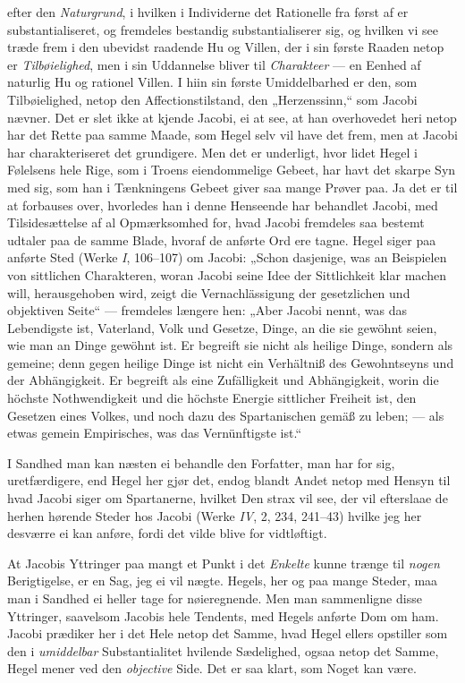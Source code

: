 \documentclass[12pt,a4paper]{book}
\newcommand{\apage}[1]{\marginnote{\footnotesize\textit{[#1]}}}
\begin{document}
efter den \emph{Naturgrund}, i hvilken i Individerne det Rationelle fra først af er
substantialiseret, og fremdeles bestandig substantialiserer sig, og hvilken vi
see træde frem i den ubevidst raadende Hu og Villen, der i sin første Raaden
netop er \emph{Tilbøielighed}, men i sin Uddannelse bliver til \emph{Charakteer} --- en
Eenhed af naturlig Hu og rationel Villen. I hiin sin første Umiddelbarhed er
den, som Tilbøielighed, netop den Affectionstilstand, den „Herzenssinn,“ som
Jacobi nævner. Det er slet ikke at kjende Jacobi, ei at see, at han overhovedet
heri netop har det Rette paa samme Maade, som Hegel selv vil have det frem, men
at Jacobi har charakteriseret det grundigere. Men det er underligt, hvor lidet
Hegel i Følelsens hele Rige, som i Troens eiendommelige Gebeet, har havt det
skarpe Syn med sig, som han i Tænkningens Gebeet giver saa mange Prøver paa. Ja
det er til at forbauses over, hvorledes han i denne Henseende har behandlet
Jacobi, med Tilsidesættelse af al Opmærksomhed for, hvad Jacobi fremdeles saa
bestemt udtaler paa de samme Blade, hvoraf de anførte Ord ere tagne. Hegel
siger paa anførte Sted (Werke \textit{I}, 106--107) om Jacobi: „Schon dasjenige, was an
Beispielen von sittlichen Charakteren, woran Jacobi seine Idee der Sittlichkeit
klar machen will, herausgehoben wird, zeigt die Vernachlässigung der
gesetzlichen und objektiven Seite“ --- fremdeles længere hen: „Aber Jacobi
nennt, was das Lebendigste ist, Vaterland, Volk und Gesetze, Dinge, an die sie
gewöhnt seien, wie man an Dinge gewöhnt ist. Er begreift sie nicht als heilige
Dinge, sondern als \apage{124} gemeine; denn gegen heilige Dinge ist nicht ein Verhältniß
des Gewohntseyns und der Abhängigkeit. Er begreift als eine Zufälligkeit und
Abhängigkeit, worin die höchste Nothwendigkeit und die höchste Energie
sittlicher Freiheit ist, den Gesetzen eines Volkes, und noch dazu des
Spartanischen gemäß zu leben; --- als etwas gemein Empirisches, was das
Vernünftigste ist.“

I Sandhed man kan næsten ei behandle den Forfatter, man har for sig,
uretfærdigere, end Hegel her gjør det, endog blandt Andet netop med Hensyn til
hvad Jacobi siger om Spartanerne, hvilket Den strax vil see, der vil efterslaae
de herhen hørende Steder hos Jacobi (Werke \textit{IV}, 2, 234, 241--43) hvilke jeg her
desværre ei kan anføre, fordi det vilde blive for vidtløftigt.

At Jacobis Yttringer paa mangt et Punkt i det \emph{Enkelte} kunne trænge til \emph{nogen}
Berigtigelse, er en Sag, jeg ei vil nægte. Hegels, her og paa mange Steder, maa
man i Sandhed ei heller tage for nøieregnende. Men man sammenligne disse
Yttringer, saavelsom Jacobis hele Tendents, med Hegels anførte Dom om ham.
Jacobi prædiker her i det Hele netop det Samme, hvad Hegel ellers opstiller som
den i \emph{umiddelbar} Substantialitet hvilende Sædelighed, ogsaa netop det Samme,
Hegel mener ved den \emph{objective} Side. Det er saa klart, som Noget kan være.
\end{document}
